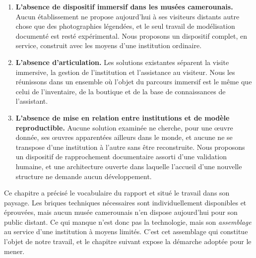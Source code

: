 \begin{enumerate}
  \item \textbf{L'absence de dispositif immersif dans les musées camerounais.}
        Aucun établissement ne propose aujourd'hui à ses visiteurs distants
        autre chose que des photographies légendées, et le seul travail de
        modélisation documenté est resté expérimental. Nous proposons un
        dispositif complet, en service, construit avec les moyens d'une
        institution ordinaire.

  \item \textbf{L'absence d'articulation.} Les solutions existantes séparent la
        visite immersive, la gestion de l'institution et l'assistance au
        visiteur. Nous les réunissons dans un ensemble où l'objet du parcours
        immersif est le même que celui de l'inventaire, de la boutique et de la
        base de connaissances de l'assistant.

  \item \textbf{L'absence de mise en relation entre institutions et de modèle
        reproductible.} Aucune solution examinée ne cherche, pour une œuvre
        donnée, ses œuvres apparentées ailleurs dans le monde, et aucune ne se
        transpose d'une institution à l'autre sans être reconstruite. Nous
        proposons un dispositif de rapprochement documentaire assorti d'une
        validation humaine, et une architecture ouverte dans laquelle l'accueil
        d'une nouvelle structure ne demande aucun développement.
\end{enumerate}

\conclchap

Ce chapitre a précisé le vocabulaire du rapport et situé le travail dans son
paysage. Les briques techniques nécessaires sont individuellement disponibles et
éprouvées, mais aucun musée camerounais n'en dispose aujourd'hui pour son public
distant. Ce qui manque n'est donc pas la technologie, mais son
\emph{assemblage} au service d'une institution à moyens limités. C'est cet
assemblage qui constitue l'objet de notre travail, et le chapitre suivant expose
la démarche adoptée pour le mener.
